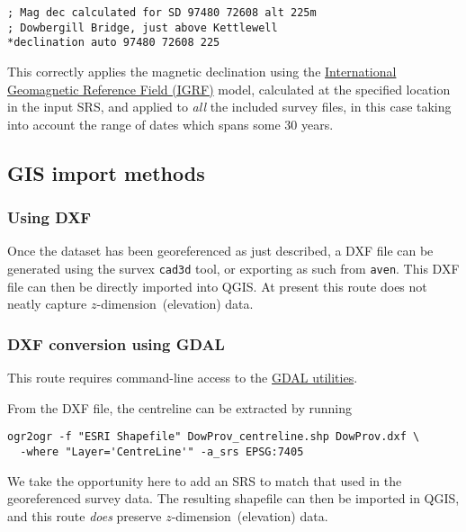 \documentclass[]{article}
\newcommand{\zdimension}{$z$-dimension}
\begin{document}
\begin{verbatim}
; Mag dec calculated for SD 97480 72608 alt 225m
; Dowbergill Bridge, just above Kettlewell
*declination auto 97480 72608 225
\end{verbatim}

This correctly applies the magnetic declination using the
\href{https://en.wikipedia.org/wiki/International_Geomagnetic_Reference_Field}{International
Geomagnetic Reference Field (IGRF)} model, calculated at the specified
location in the input SRS, and applied to \emph{all} the included survey
files, in this case taking into account the range of dates which spans
some 30 years.

\subsection{GIS import methods}\label{gis-import-methods}

\subsubsection{Using DXF}\label{quick-and-dirty-two-dimensional-flat-import}

Once the dataset has been georeferenced as just described, a DXF file
can be generated using the survex \verb}cad3d} tool, or exporting as
such from \verb}aven}.  This DXF file can then be directly imported
into QGIS.  At present this route does not neatly capture
\zdimension\ (elevation) data.

\subsubsection{DXF conversion using GDAL}\label{three-dimensional-import}

This route requires command-line access to the
\href{http://www.gdal.org/ogr_utilities.html}{GDAL utilities}.

From the DXF file, the centreline can be extracted by running

\begin{verbatim}
ogr2ogr -f "ESRI Shapefile" DowProv_centreline.shp DowProv.dxf \
  -where "Layer='CentreLine'" -a_srs EPSG:7405
\end{verbatim}

We take the opportunity here to add an SRS to match that used in the
georeferenced survey data. The resulting shapefile can then be imported
in QGIS, and this route \emph{does} preserve \zdimension\ (elevation)
data. 
\end{document}
